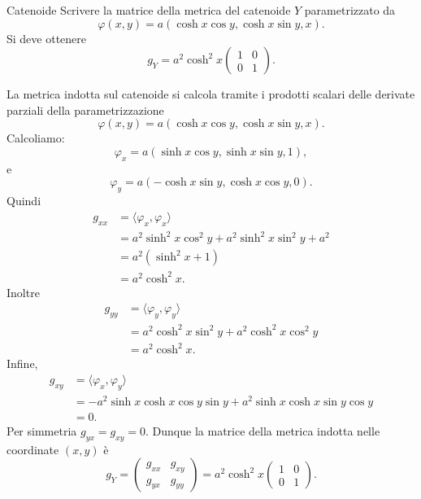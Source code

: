 \documentclass[a4paper]{article}
\begin{document}
\begin{snippetexercise}{Catenoide}
    Scrivere la matrice della metrica del catenoide \(Y\) parametrizzato da
    \[
        \varphi(x,y)
        =
        a\left(
            \cosh x\cos y,
            \cosh x\sin y,
            x
        \right).
    \]
    Si deve ottenere
    \[
        g_Y
        =
        a^2\cosh^2 x
        \begin{pmatrix}
            1 & 0\\
            0 & 1
        \end{pmatrix}.
    \]
\end{snippetexercise}

\begin{snippetsolution}{}
    La metrica indotta sul catenoide si calcola tramite i prodotti scalari delle derivate parziali della parametrizzazione
    \[
        \varphi(x,y)
        =
        a\left(
            \cosh x\cos y,
            \cosh x\sin y,
            x
        \right).
    \]
    Calcoliamo:
    \[
        \varphi_x
        =
        a\left(
            \sinh x\cos y,
            \sinh x\sin y,
            1
        \right),
    \]
    e
    \[
        \varphi_y
        =
        a\left(
            -\cosh x\sin y,
            \cosh x\cos y,
            0
        \right).
    \]
    Quindi
    \begin{align*}
        g_{xx}
        &=
        \langle\varphi_x,\varphi_x\rangle\\
        &=
        a^2\sinh^2x\cos^2y
        +
        a^2\sinh^2x\sin^2y
        +
        a^2\\
        &=
        a^2(\sinh^2x+1)\\
        &=
        a^2\cosh^2x.
    \end{align*}
    Inoltre
    \begin{align*}
        g_{yy}
        &=
        \langle\varphi_y,\varphi_y\rangle\\
        &=
        a^2\cosh^2x\sin^2y
        +
        a^2\cosh^2x\cos^2y\\
        &=
        a^2\cosh^2x.
    \end{align*}
    Infine,
    \begin{align*}
        g_{xy}
        &=
        \langle\varphi_x,\varphi_y\rangle\\
        &=
        -a^2\sinh x\cosh x\cos y\sin y
        +
        a^2\sinh x\cosh x\sin y\cos y\\
        &=
        0.
    \end{align*}
    Per simmetria \(g_{yx}=g_{xy}=0\). Dunque la matrice della metrica indotta nelle coordinate \((x,y)\) è
    \[
        g_Y
        =
        \begin{pmatrix}
            g_{xx} & g_{xy}\\
            g_{yx} & g_{yy}
        \end{pmatrix}
        =
        a^2\cosh^2 x
        \begin{pmatrix}
            1 & 0\\
            0 & 1
        \end{pmatrix}.
    \]
\end{snippetsolution}
\end{document}
